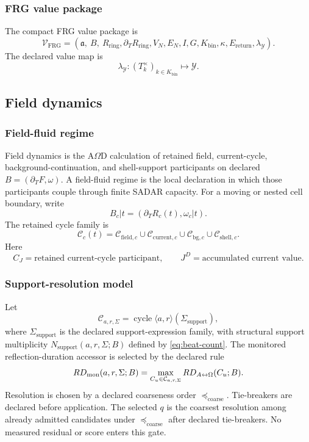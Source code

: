 \subsubsection{FRG value package}\label{subsec:frg-value-package}
The compact FRG value package is
\begin{equation*}
\mathcal V_{\mathrm{FRG}}
=
(\mathfrak a,\ B,\ R_{\mathrm{ring}},\partial_T R_{\mathrm{ring}},
V_N,E_N,I,G,K_{\mathrm{bin}},\kappa,E_{\mathrm{return}},\lambda_{\mathcal Y}).
\tag{RG11}\label{eq:frg-value-package}
\end{equation*}
The declared value map is
\begin{equation*}
\lambda_{\mathcal Y}:
(T_k^\times)_{k\in K_{\mathrm{bin}}}
\mapsto
\mathcal Y.
\tag{RG12}\label{eq:frg-value-map}
\end{equation*}


\subsection{Field dynamics}\label{sec:field-dynamics}

\subsubsection{Field-fluid regime}\label{subsec:field-fluid-regime}
Field dynamics is the A\(\Omega\)D calculation of retained field, current-cycle, background-continuation, and shell-support participants on declared \(B=(\partial_TF,\omega)\). A field-fluid regime is the local declaration in which those participants couple through finite SADAR capacity. For a moving or nested cell boundary, write
\[
B_c|t=(\partial_T R_c(t),\omega_c|t).
\]
The retained cycle family is
\[
\mathcal C_c(t)
=
\mathcal C_{\mathrm{field},c}
\cup
\mathcal C_{\mathrm{current},c}
\cup
\mathcal C_{\mathrm{bg},c}
\cup
\mathcal C_{\mathrm{shell},c}.
\]
Here
\[
C_J=\text{retained current-cycle participant},
\qquad
J^D=\text{accumulated current value}.
\]

\subsubsection{Support-resolution model}
\label{subsec:cycle-beat-resolution-gate}
Let
\[
\mathcal C_{a,r,\Sigma}
=
\operatorname{cycle}\langle a,r\rangle(\Sigma_{\mathrm{support}}),
\]
where \(\Sigma_{\mathrm{support}}\) is the declared support-expression family,
with structural support multiplicity \(N_{\mathrm{support}}(a,r,\Sigma;B)\)
defined by \eqref{eq:beat-count}.
The monitored reflection-duration accessor is selected by the declared rule
\[
RD_{\mathrm{mon}}(a,r,\Sigma;B)
=
\max_{C_u\in\mathcal C_{a,r,\Sigma}}
RD_{A{\leftrightarrow}\Omega}(C_u;B).
\]
Resolution is chosen by a declared coarseness order \(\preceq_{\mathrm{coarse}}\). Tie-breakers are declared before application. The selected \(q\) is the coarsest resolution among already admitted candidates under \(\preceq_{\mathrm{coarse}}\) after declared tie-breakers. No measured residual or score enters this gate.

